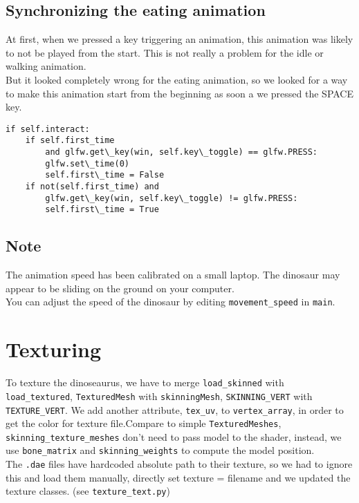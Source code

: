 \documentclass[11pt]{article}
\begin{document}
\subsection*{Synchronizing the eating animation}
\noindent At first, when we pressed a key triggering an animation, this animation was likely to not be played from the start. This is not really a problem for the idle or walking animation.\\
But it looked completely wrong for the eating animation, so we looked for a way to make this animation start from the beginning as soon a we pressed the SPACE key.

\begin{verbatim}
if self.interact:
    if self.first_time
        and glfw.get\_key(win, self.key\_toggle) == glfw.PRESS:
        glfw.set\_time(0)
        self.first\_time = False
    if not(self.first_time) and
        glfw.get\_key(win, self.key\_toggle) != glfw.PRESS:
        self.first\_time = True
\end{verbatim}

\subsection*{Note}
\noindent The animation speed has been calibrated on a small laptop. The dinosaur may appear to be sliding on the ground on your computer.\\
You can adjust the speed of the dinosaur by editing \texttt{movement\_speed} in \texttt{main}.

\section{Texturing}
\noindent To texture the dinoseaurus, we have to merge \texttt{load\_skinned} with \texttt{load\_textured}, \texttt{TexturedMesh} with \texttt{skinningMesh}, \texttt{SKINNING\_VERT} with \texttt{TEXTURE\_VERT}. We add another attribute, \texttt{tex\_uv}, to \texttt{vertex\_array}, in order to get the color for texture file.Compare to simple \texttt{TexturedMeshes}, \texttt{skinning\_texture\_meshes} don't need to pass model to the shader, instead, we use \texttt{bone\_matrix} and \texttt{skinning\_weights} to compute the model position.\\
The \texttt{.dae} files have hardcoded absolute path to their texture, so we had to ignore this and load them manually, directly set texture = filename and we updated the texture classes. (see \texttt{texture\_text.py})
\end{document}
